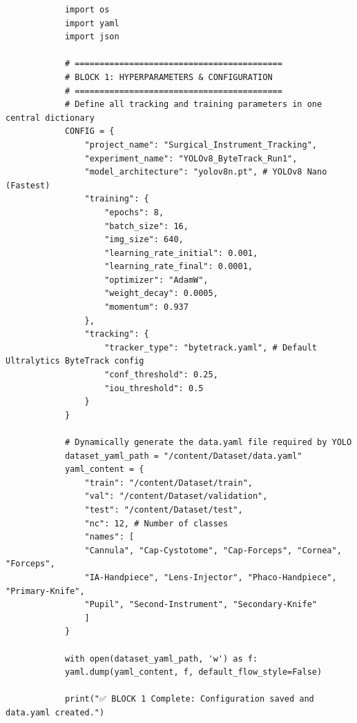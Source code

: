 \documentclass{article}
\begin{document}
\begin{latin}
	\begin{LTR}
		\begin{verbatim}
			import os
			import yaml
			import json
			
			# ==========================================
			# BLOCK 1: HYPERPARAMETERS & CONFIGURATION
			# ==========================================
			# Define all tracking and training parameters in one central dictionary
			CONFIG = {
				"project_name": "Surgical_Instrument_Tracking",
				"experiment_name": "YOLOv8_ByteTrack_Run1",
				"model_architecture": "yolov8n.pt", # YOLOv8 Nano (Fastest)
				"training": {
					"epochs": 8,
					"batch_size": 16,
					"img_size": 640,
					"learning_rate_initial": 0.001,
					"learning_rate_final": 0.0001,
					"optimizer": "AdamW",
					"weight_decay": 0.0005,
					"momentum": 0.937
				},
				"tracking": {
					"tracker_type": "bytetrack.yaml", # Default Ultralytics ByteTrack config
					"conf_threshold": 0.25,
					"iou_threshold": 0.5
				}
			}
			
			# Dynamically generate the data.yaml file required by YOLO
			dataset_yaml_path = "/content/Dataset/data.yaml"
			yaml_content = {
				"train": "/content/Dataset/train",
				"val": "/content/Dataset/validation",
				"test": "/content/Dataset/test",
				"nc": 12, # Number of classes
				"names": [
				"Cannula", "Cap-Cystotome", "Cap-Forceps", "Cornea", "Forceps",
				"IA-Handpiece", "Lens-Injector", "Phaco-Handpiece", "Primary-Knife",
				"Pupil", "Second-Instrument", "Secondary-Knife"
				]
			}
			
			with open(dataset_yaml_path, 'w') as f:
			yaml.dump(yaml_content, f, default_flow_style=False)
			
			print("✅ BLOCK 1 Complete: Configuration saved and data.yaml created.")
		\end{verbatim}
	\end{LTR}
\end{latin}
\end{document}

